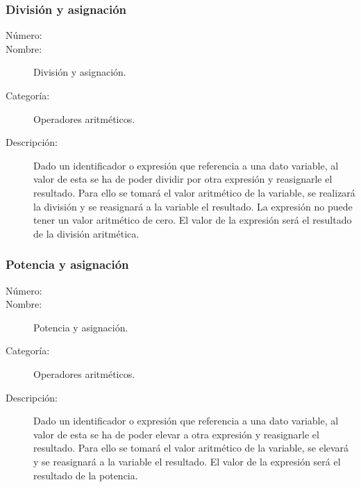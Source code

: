 \subsubsection{División y asignación}
	\begin{description}
		\item [Número:] \cn
		\item [Nombre:] División y asignación.
		\item [Categoría:] Operadores aritméticos.
		\item [Descripción:] Dado un identificador o expresión que referencia a una dato variable, al valor de esta se ha de poder dividir por
		otra expresión y reasignarle el resultado. Para ello se tomará el valor aritmético de la variable, se realizará la división y se reasignará a la variable el resultado. La expresión no puede tener un valor aritmético de cero.
		El valor de la expresión será el resultado de la división aritmética.
	\end {description}

\subsubsection{Potencia y asignación}
	\begin{description}
		\item [Número:] \cn
		\item [Nombre:] Potencia y asignación.
		\item [Categoría:] Operadores aritméticos.
		\item [Descripción:] Dado un identificador o expresión que referencia a una dato variable, al valor de esta se ha de poder elevar a
		otra expresión y reasignarle el resultado. Para ello se tomará el valor aritmético de la variable, se elevará  y se reasignará a la variable el resultado. El valor de la expresión será el resultado de la potencia.
	\end {description}

